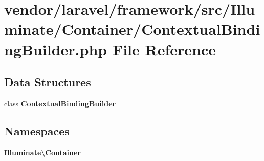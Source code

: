 \section{vendor/laravel/framework/src/\+Illuminate/\+Container/\+Contextual\+Binding\+Builder.php File Reference}
\label{_container_2_contextual_binding_builder_8php}
\subsection*{Data Structures}
\begin{DoxyCompactItemize}
\item 
class {\bf Contextual\+Binding\+Builder}
\end{DoxyCompactItemize}
\subsection*{Namespaces}
\begin{DoxyCompactItemize}
\item 
 {\bf Illuminate\textbackslash{}\+Container}
\end{DoxyCompactItemize}
